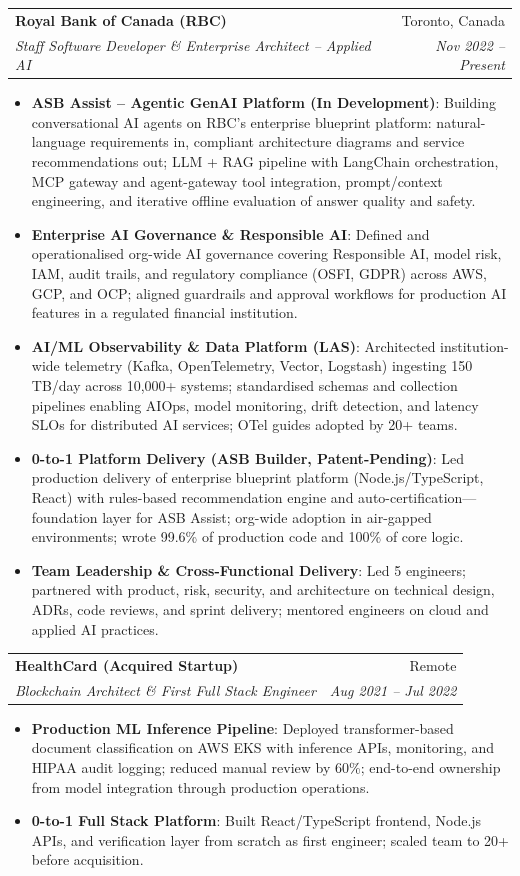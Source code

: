 \documentclass[letterpaper,9.5pt]{article}
\makeatletter
\newcommand{\resumeItem}[2]{\item\small{\textbf{#1}{: #2 \vspace{-2pt}}}}
\newcommand{\resumeSubheading}[4]{\vspace{-2pt}\item\begin{tabular*}{0.97\textwidth}{l@{\extracolsep{\fill}}r}\textbf{#1} & #2 \\\textit{\small#3} & \textit{\small #4} \\\end{tabular*}\vspace{-6pt}}
\newcommand{\resumeItemListStart}{\begin{itemize}}
\newcommand{\resumeItemListEnd}{\end{itemize}\vspace{-6pt}}
\makeatother
\begin{document}
  \resumeSubheading
    {Royal Bank of Canada (RBC)}{Toronto, Canada}
    {Staff Software Developer \& Enterprise Architect -- Applied AI}{Nov 2022 -- Present}
  \resumeItemListStart
    \resumeItem{ASB Assist -- Agentic GenAI Platform (In Development)}
      {Building conversational AI agents on RBC's enterprise blueprint platform: natural-language requirements in, compliant architecture diagrams and service recommendations out; LLM + RAG pipeline with LangChain orchestration, MCP gateway and agent-gateway tool integration, prompt/context engineering, and iterative offline evaluation of answer quality and safety.}
    \resumeItem{Enterprise AI Governance \& Responsible AI}
      {Defined and operationalised org-wide AI governance covering Responsible AI, model risk, IAM, audit trails, and regulatory compliance (OSFI, GDPR) across AWS, GCP, and OCP; aligned guardrails and approval workflows for production AI features in a regulated financial institution.}
    \resumeItem{AI/ML Observability \& Data Platform (LAS)}
      {Architected institution-wide telemetry (Kafka, OpenTelemetry, Vector, Logstash) ingesting 150\,TB/day across 10,000+ systems; standardised schemas and collection pipelines enabling AIOps, model monitoring, drift detection, and latency SLOs for distributed AI services; OTel guides adopted by 20+ teams.}
    \resumeItem{0-to-1 Platform Delivery (ASB Builder, Patent-Pending)}
      {Led production delivery of enterprise blueprint platform (Node.js/TypeScript, React) with rules-based recommendation engine and auto-certification---foundation layer for ASB Assist; org-wide adoption in air-gapped environments; wrote 99.6\% of production code and 100\% of core logic.}
    \resumeItem{Team Leadership \& Cross-Functional Delivery}
      {Led 5 engineers; partnered with product, risk, security, and architecture on technical design, ADRs, code reviews, and sprint delivery; mentored engineers on cloud and applied AI practices.}
  \resumeItemListEnd

  \resumeSubheading
    {HealthCard (Acquired Startup)}{Remote}
    {Blockchain Architect \& First Full Stack Engineer}{Aug 2021 -- Jul 2022}
  \resumeItemListStart
    \resumeItem{Production ML Inference Pipeline}
      {Deployed transformer-based document classification on AWS EKS with inference APIs, monitoring, and HIPAA audit logging; reduced manual review by 60\%; end-to-end ownership from model integration through production operations.}
    \resumeItem{0-to-1 Full Stack Platform}
      {Built React/TypeScript frontend, Node.js APIs, and verification layer from scratch as first engineer; scaled team to 20+ before acquisition.}
  \resumeItemListEnd
\end{document}

